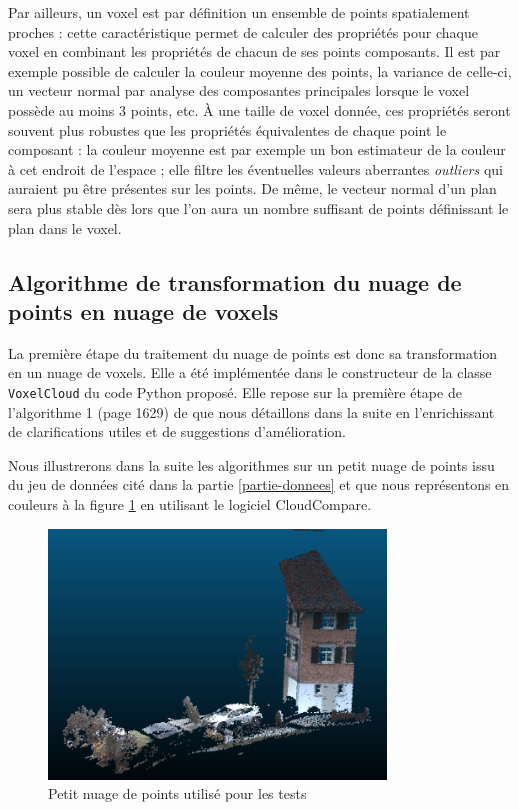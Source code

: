 \documentclass[a4paper, onecolumn, 11pt]{article}
\begin{document}
Par ailleurs, un voxel est par définition un ensemble de points spatialement proches : cette caractéristique permet de calculer des propriétés pour chaque voxel en combinant les propriétés de chacun de ses points composants. Il est par exemple possible de calculer la couleur moyenne des points, la variance de celle-ci, un vecteur normal par analyse des composantes principales lorsque le voxel possède au moins 3 points, etc. À une taille de voxel donnée, ces propriétés seront souvent plus robustes que les propriétés équivalentes de chaque point le composant : la couleur moyenne est par exemple un bon estimateur de la couleur à cet endroit de l'espace ; elle filtre les éventuelles valeurs aberrantes \emph{outliers} qui auraient pu être présentes sur les points. De même, le vecteur normal d'un plan sera plus stable dès lors que l'on aura un nombre suffisant de points définissant le plan dans le voxel.

\subsection{Algorithme de transformation du nuage de points en nuage de voxels}
\label{partie-algo-voxels}
La première étape du traitement du nuage de points est donc sa transformation en un nuage de voxels. Elle a été implémentée dans le constructeur de la classe \texttt{VoxelCloud} du code Python proposé. Elle repose sur la première étape de l'algorithme 1 (page 1629) de \cite{aka_article} que nous détaillons dans la suite en l'enrichissant de clarifications utiles et de suggestions d'amélioration.

Nous illustrerons dans la suite les algorithmes sur un petit nuage de points issu du jeu de données cité dans la partie \ref{partie-donnees} et que nous représentons en couleurs à la figure \ref{fig:smallcloud} en utilisant le logiciel CloudCompare.

\begin{figure}[h]
    \centering
    \includegraphics[width=0.8\textwidth]{fig/smallcloud_0.png}
    \caption{Petit nuage de points utilisé pour les tests}
    \label{fig:smallcloud}
\end{figure}
\end{document}
